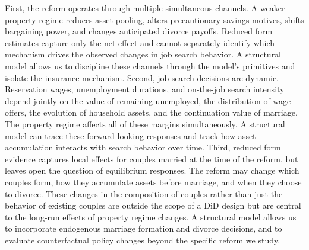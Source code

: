 \documentclass[11pt]{article}
\begin{document}
First, the reform operates through multiple simultaneous channels. A weaker property regime reduces asset pooling, alters precautionary savings motives, shifts bargaining power, and changes anticipated divorce payoffs. Reduced form estimates capture only the net effect and cannot separately identify which mechanism drives the observed changes in job search behavior. A structural model allows us to discipline these channels through the model's primitives and isolate the insurance mechanism. Second, job search decisions are dynamic. Reservation wages, unemployment durations, and on-the-job search intensity depend jointly on the value of remaining unemployed, the distribution of wage offers, the evolution of household assets, and the continuation value of marriage. The property regime affects all of these margins simultaneously. A structural model can trace these forward-looking responses and track how asset accumulation interacts with search behavior over time. Third, reduced form evidence captures local effects for couples married at the time of the reform, but leaves open the question of equilibrium responses. The reform may change which couples form, how they accumulate assets before marriage, and when they choose to divorce. These changes in the composition of couples rather than just the behavior of existing couples are outside the scope of a DiD design but are central to the long-run effects of property regime changes. A structural model allows us to incorporate endogenous marriage formation and divorce decisions, and to evaluate counterfactual policy changes beyond the specific reform we study.


\end{document}
